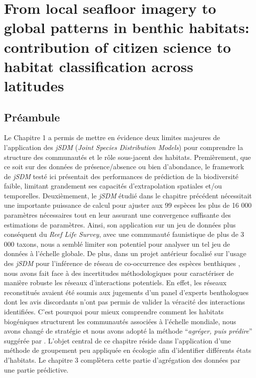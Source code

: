 \begin{refsection}

\hypertarget{from-local-seafloor-imagery-to-global-patterns-in-benthic-habitats-contribution-of-citizen-science-to-habitat-classification-across-latitudes}{%
\chapter{From local seafloor imagery to global patterns in benthic
habitats: contribution of citizen science to habitat classification
across
latitudes}\label{from-local-seafloor-imagery-to-global-patterns-in-benthic-habitats-contribution-of-citizen-science-to-habitat-classification-across-latitudes}}

\hypertarget{preambule-chapter2}{%
\section*{Préambule}\label{preambule-chapter2}}

Le Chapitre 1 a permis de mettre en évidence deux limites majeures de
l'application des \emph{jSDM} (\emph{Joint Species Distribution Models})
pour comprendre la structure des communautés et le rôle sous-jacent des
habitats. Premièrement, que ce soit sur des données de présence/absence
ou bien d'abondance, le framework de \emph{jSDM} testé ici présentait
des performances de prédiction de la biodiversité faible, limitant
grandement ses capacités d'extrapolation spatiales et/ou temporelles.
Deuxièmement, le \emph{jSDM} étudié dans le chapitre précédent
nécessitait une importante puissance de calcul pour ajuster aux 99
espèces les plus de 16 000 paramètres nécessaires tout en leur assurant
une convergence suffisante des estimations de paramètres. Ainsi, son
application sur un jeu de données plus conséquent du \emph{Reef Life
Survey}, avec une communauté faunistique de plus de 3 000 taxons, nous a
semblé limiter son potentiel pour analyser un tel jeu de données à
l'échelle globale. De plus, dans un projet antérieur focalisé sur
l'usage des \emph{jSDM} pour l'inférence de réseau de co-occurrence des
espèces benthiques \autocite{Violet_2020}, nous avons fait face à des
incertitudes méthodologiques pour caractériser de manière robuste les
réseaux d'interactions potentiels. En effet, les réseaux reconstitués
avaient été soumis aux jugements d'un panel d'experts benthologues dont
les avis discordants n'ont pas permis de valider la véracité des
interactions identifiées. C'est pourquoi pour mieux comprendre comment
les habitats biogéniques structurent les communautés associées à
l'échelle mondiale, nous avons changé de stratégie et nous avons adopté
la méthode ``\emph{agréger, puis prédire}'' suggérée par
\textcite{Ferrier_2006}. L'objet central de ce chapitre réside dans
l'application d'une méthode de groupement peu appliquée en écologie afin
d'identifier différents états d'habitats. Le chapitre 3 complètera cette
partie d'agrégation des données par une partie prédictive.


\end{refsection}
